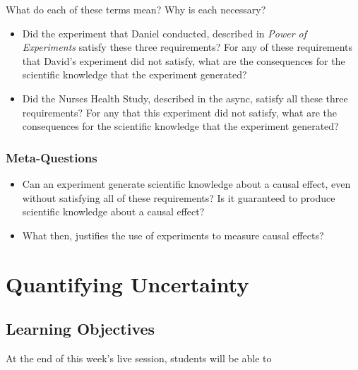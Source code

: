 \documentclass[
]{article}
\providecommand{\tightlist}{%
  \setlength{\itemsep}{0pt}\setlength{\parskip}{0pt}}
\begin{document}
What do each of these terms mean? Why is each necessary?

\begin{itemize}
\tightlist
\item
  Did the experiment that Daniel conducted, described in \emph{Power of Experiments} satisfy these three requirements? For any of these requirements that David's experiment did not satisfy, what are the consequences for the scientific knowledge that the experiment generated?\\
\item
  Did the Nurses Health Study, described in the async, satisfy all these three requirements? For any that this experiment did not satisfy, what are the consequences for the scientific knowledge that the experiment generated?
\end{itemize}

\hypertarget{meta-questions}{%
\subsubsection{Meta-Questions}\label{meta-questions}}

\begin{itemize}
\tightlist
\item
  Can an experiment generate scientific knowledge about a causal effect, even without satisfying all of these requirements? Is it guaranteed to produce scientific knowledge about a causal effect?
\item
  What then, justifies the use of experiments to measure causal effects?
\end{itemize}

\hypertarget{quantifying-uncertainty}{%
\section{Quantifying Uncertainty}\label{quantifying-uncertainty}}

\hypertarget{learning-objectives-2}{%
\subsection{Learning Objectives}\label{learning-objectives-2}}

At the end of this week's live session, students will be able to
\end{document}
